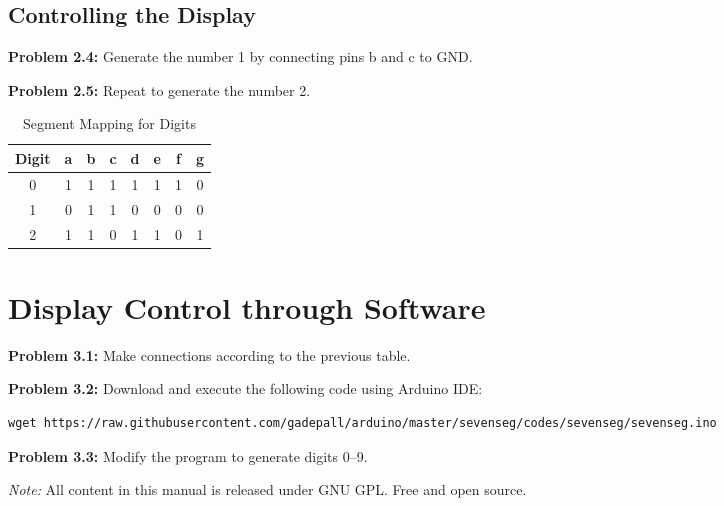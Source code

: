 \documentclass[12pt]{article}
\begin{document}
\subsection{Controlling the Display}
\textbf{Problem 2.4:} Generate the number 1 by connecting pins b and c to GND.

\textbf{Problem 2.5:} Repeat to generate the number 2.

\begin{table}[h!]
\centering
\begin{tabular}{|c|c|c|c|c|c|c|c|}
\hline
\textbf{Digit} & a & b & c & d & e & f & g \\
\hline
0 & 1 & 1 & 1 & 1 & 1 & 1 & 0 \\
1 & 0 & 1 & 1 & 0 & 0 & 0 & 0 \\
2 & 1 & 1 & 0 & 1 & 1 & 0 & 1 \\
\hline
\end{tabular}
\caption{Segment Mapping for Digits}
\end{table}

\section{Display Control through Software}

\textbf{Problem 3.1:} Make connections according to the previous table.

\textbf{Problem 3.2:} Download and execute the following code using Arduino IDE:

\begin{verbatim}
wget https://raw.githubusercontent.com/gadepall/arduino/master/sevenseg/codes/sevenseg/sevenseg.ino
\end{verbatim}

\textbf{Problem 3.3:} Modify the program to generate digits 0–9.

\vspace{1em}
\noindent\textit{Note:} All content in this manual is released under GNU GPL. Free and open source.
\end{document}
